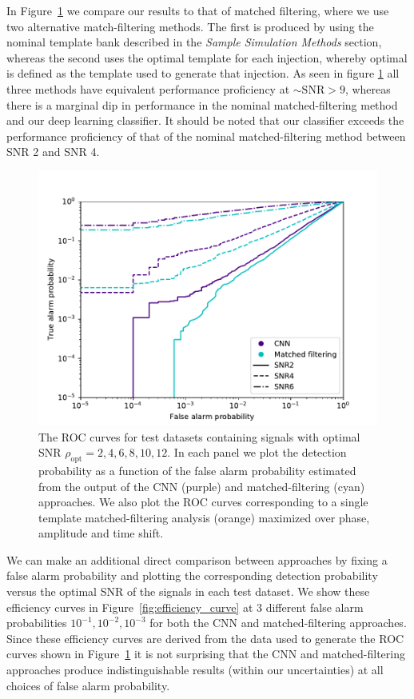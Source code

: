 \documentclass[%
showpacs,
 amsmath,amssymb,
 aps,
 twocolumn,
 prl,
 reprint,
floatfix,
]{revtex4-1}
\begin{document}
%
%
In Figure~\ref{fig:ROC_curves} we
compare our results to that of matched filtering, where we use two alternative
match-filtering methods.  The first is produced by using the nominal template bank described
in the \textit{Sample Simulation Methods} section, whereas the second uses the
optimal template for each injection, whereby optimal is defined as the template
used to generate that injection. As seen in figure \ref{fig:ROC_curves} all
three methods have equivalent performance proficiency at $\sim \mathrm{SNR} >
9$, whereas there is a marginal dip in performance in the nominal matched-filtering 
method and our deep learning classifier. It should be noted that our
classifier exceeds the performance proficiency of that of the nominal matched-filtering 
method between SNR 2 and SNR 4.

%
%
\begin{figure}[]
\includegraphics[width=\columnwidth] {figures/ROC_curves.pdf}
\caption{The \ac{ROC} curves for test datasets containing 
signals with optimal SNR $\rho_{\mathrm{opt}}=2,4,6,8,10,12$.  In each panel we plot the detection
probability as a function of the false alarm probability estimated from the
output of the \ac{CNN} (purple) and matched-filtering (cyan) approaches. We also
plot the \ac{ROC} curves corresponding to a single template matched-filtering
analysis (orange) maximized over phase, amplitude and time shift.}

\label{fig:ROC_curves}
\end{figure}

%
%
We can make an additional direct comparison between approaches by fixing a
false alarm probability and plotting the corresponding detection probability
versus the optimal SNR of the signals in each test dataset. We show these
efficiency curves in Figure~\ref{fig:efficiency_curve} at 3 different false alarm
probabilities $10^{-1},10^{-2},10^{-3}$ for both the \ac{CNN} and
matched-filtering approaches. Since these efficiency curves are derived from
the data used to generate the \ac{ROC} curves shown in
Figure~\ref{fig:ROC_curves} it is not surprising that the \ac{CNN} and
matched-filtering approaches produce indistinguishable results (within our
uncertainties) at all choices of false alarm probability.
\end{document}
